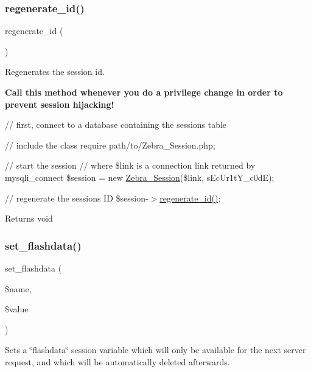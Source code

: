 \subsubsection{\texorpdfstring{regenerate\+\_\+id()}{regenerate\_id()}}
{\footnotesize\ttfamily regenerate\+\_\+id (\begin{DoxyParamCaption}{ }\end{DoxyParamCaption})}

Regenerates the session id.

{\bfseries Call this method whenever you do a privilege change in order to prevent session hijacking!}

{\ttfamily  // first, connect to a database containing the sessions table}

{\ttfamily // include the class require \textquotesingle{}path/to/\+Zebra\+\_\+\+Session.\+php\textquotesingle{};}

{\ttfamily // start the session // where \$link is a connection link returned by mysqli\+\_\+connect \$session = new \mbox{\hyperlink{class_zebra___session}{Zebra\+\_\+\+Session}}(\$link, \textquotesingle{}s\+Ec\+Ur1t\+Y\+\_\+c0dE\textquotesingle{});}

{\ttfamily // regenerate the session\textquotesingle{}s ID \$session-\/$>$\mbox{\hyperlink{class_zebra___session_a55c3728e57cce5405330bd67c44906fb}{regenerate\+\_\+id()}}; }

\begin{DoxyReturn}{Returns}
void 
\end{DoxyReturn}
\mbox{\label{class_zebra___session_acc03870f281b5f4c00dc940849b2c83e}} 
\subsubsection{\texorpdfstring{set\+\_\+flashdata()}{set\_flashdata()}}
{\footnotesize\ttfamily set\+\_\+flashdata (\begin{DoxyParamCaption}\item[{}]{\$name,  }\item[{}]{\$value }\end{DoxyParamCaption})}

Sets a \char`\"{}flashdata\char`\"{} session variable which will only be available for the next server request, and which will be automatically deleted afterwards.

